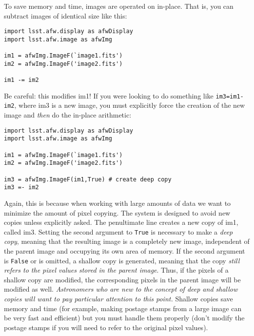 To save memory and time, images are operated on in-place.  That is,
you can subtract images of identical size like this:

\begin{verbatim}
import lsst.afw.display as afwDisplay
import lsst.afw.image as afwImg

im1 = afwImg.ImageF(`image1.fits')
im2 = afwImg.ImageF('image2.fits')

im1 -= im2
\end{verbatim}

Be careful: this modifies im1!  If you were looking to do something
like \texttt{im3=im1-im2}, where im3 is a new image, you must
explicitly force the creation of the new image and {\it then} do the
in-place arithmetic:

\begin{verbatim}
import lsst.afw.display as afwDisplay
import lsst.afw.image as afwImg

im1 = afwImg.ImageF(`image1.fits')
im2 = afwImg.ImageF('image2.fits')

im3 = afwImg.ImageF(im1,True) # create deep copy
im3 =- im2
\end{verbatim}

Again, this is because when working with large amounts of data we want
to minimize the amount of pixel copying.  The system is designed to
avoid new copies unless explicitly asked.  The penultimate line
creates a new copy of im1, called im3.  Setting the second argument
to \texttt{True} is necessary to make a {\it deep copy}, meaning that
the resulting image is a completely new image, independent of the
parent image and occupying its own area of memory.  If the second
argument is \texttt{False} or is omitted, a shallow copy is generated,
meaning that the copy {\it still refers to the pixel values stored in
the parent image}.  Thus, if the pixels of a shallow copy are
modified, the corresponding pixels in the parent image will be
modified as well.  {\it Astronomers who are new to the concept of deep
and shallow copies will want to pay particular attention to this
point.}  Shallow copies save memory and time (for example, making
postage stamps from a large image can be very fast and efficient) but
you must handle them properly (don't modify the postage stamps if you
will need to refer to the original pixel values).

